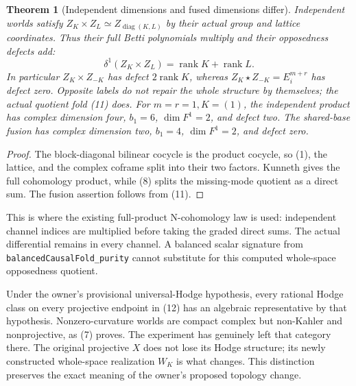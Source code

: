 \documentclass[11pt]{article}
\newtheorem{theorem}{Theorem}
\newcommand{\rank}{\operatorname{rank}}
\begin{document}
\begin{theorem}[Independent dimensions and fused dimensions differ]
Independent worlds satisfy
$Z_K\times Z_L\simeq Z_{\operatorname{diag}(K,L)}$ by their actual group
and lattice coordinates. Thus their full Betti polynomials multiply and
their opposedness defects add:
\[
 \delta^1(Z_K\times Z_L)=\rank K+\rank L.              \tag{15}
\]
In particular $Z_K\times Z_{-K}$ has defect $2\rank K$, whereas
$Z_K\star Z_{-K}=E_i^{m+r}$ has defect zero. Opposite labels do not
repair the whole structure by themselves; the actual quotient fold (11)
does. For $m=r=1,K=(1)$, the independent product has complex dimension
four, $b_1=6$, $\dim F^1=2$, and defect two. The shared-base fusion has
complex dimension two, $b_1=4$, $\dim F^1=2$, and defect zero.
\end{theorem}
\begin{proof}
The block-diagonal bilinear cocycle is the product cocycle, so (1), the
lattice, and the complex coframe split into their two factors. Kunneth
gives the full cohomology product, while (8) splits the missing-mode
quotient as a direct sum. The fusion assertion follows from (11).
\end{proof}
This is where the existing full-product N-cohomology law is used: independent
channel indices are multiplied before taking the graded direct sums.
The actual differential remains in every channel. A balanced scalar
signature from \texttt{balancedCausalFold\_purity} cannot substitute for
this computed whole-space opposedness quotient.

Under the owner's provisional universal-Hodge hypothesis, every rational
Hodge class on every projective endpoint in (12) has an algebraic
representative by that hypothesis. Nonzero-curvature worlds are compact
complex but non-Kahler and nonprojective, as (7) proves. The experiment
has genuinely left that category there. The original projective $X$
does not lose its Hodge structure; its newly constructed whole-space
realization $W_K$ is what changes. This distinction preserves the exact
meaning of the owner's proposed topology change.
\end{document}
